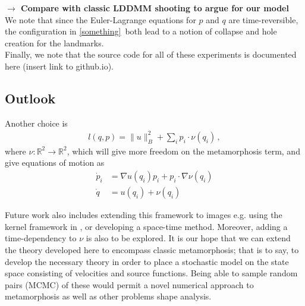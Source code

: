 \documentclass{article}
\begin{document}




\textbf{$\longrightarrow$ Compare with classic LDDMM shooting to argue for our
model}\\

We note that since the Euler-Lagrange equations for $p$ and $q$ are
time-reversible, the configuration in \ref{something} both lead to a notion of
collapse and hole creation for the landmarks.\\

Finally, we note that the source code for all of these experiments is documented
here (insert link to github.io). 

\subsection{Outlook}\label{sec:outlook}
Another choice is 
\begin{align}
    l(q,p) = \|u\|_B^2 + \sum_i p_i\cdot \nu(q_i) \, , 
\end{align}
where $\nu:\mathbb R^2 \to \mathbb R^2$, which will give more freedom on the metamorphosis term, and give equations of motion as 
\begin{align}
    \dot p_i  &= \nabla u(q_i)p_i  + p_i \cdot \nabla \nu(q_i)\\
    \dot q &= u(q_i) + \nu(q_i) 
\end{align}

Future work also includes extending this framework to images e.g. using the
kernel framework in \cite{richardson2016metamorphosis}, or developing a
space-time method. Moreover, adding a time-dependency to $\nu$ is also to be
explored. It is our hope that we can extend the theory developed here to
encompass classic metamorphosis; that is to say, to develop the necessary theory
in order to place a stochastic model on the state space consisting of
velocities and source functions. Being able to sample random pairs (MCMC) of these
would permit a novel numerical approach to metamorphosis as well as other
problems shape analysis.



\end{document}

